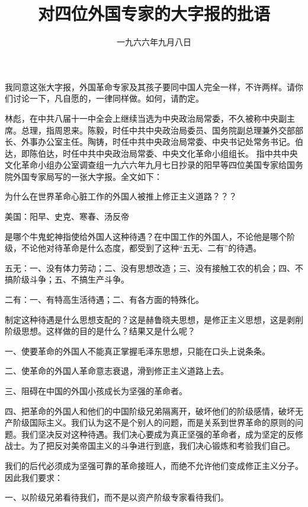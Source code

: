 
\title{对四位外国专家的大字报的批语}
\date{一九六六年九月八日}
\maketitle



我同意这张大字报，外国革命专家及其孩子要同中国人完全一样，不许两样。请你们讨论一下，凡自愿的，一律同样做。如何，请酌定。

\begin{maonote}
林彪，在中共八届十一中全会上继续当选为中央政治局常委，不久被称中央副主席。总理，指周恩来。陈毅，时任中共中央政治局委员、国务院副总理兼外交部部长、外事办公室主任。陶铸，时任中共中央政治局常委、中央书记处常务书记。伯达，即陈伯达，时任中共中央政治局常委、中央文化革命小组组长。
指中共中央文化革命小组办公室调查组一九六六年九月七日抄录的阳早等四位美国专家给国务院外国专家局写的一张大字报。全文如下：

为什么在世界革命心脏工作的外国人被推上修正主义道路？？？

美国：阳早、史克、寒春、汤反帝

是哪个牛鬼蛇神指使给外国人这种待遇？在中国工作的外国人，不论他是哪个阶级，不论他对待革命是什么态度，都受到了这种“五无、二有”的待遇。

五无：一、没有体力劳动；二、没有思想改造；三、没有接触工农的机会；四、不搞阶级斗争；五、不搞生产斗争。

二有：一、有特高生活待遇；二、有各方面的特殊化。

制定这种待遇是什么思想支配的？这是赫鲁晓夫思想，是修正主义思想，这是剥削阶级思想。这样做的目的是什么？结果又是什么呢？

一、使要革命的外国人不能真正掌握毛泽东思想，只能在口头上说条条。

二、使革命的外国人革命意志衰退，滑到修正主义道路上去。

三、阻碍在中国的外国小孩成长为坚强的革命者。

四、把革命的外国人和他们的中国阶级兄弟隔离开，破坏他们的阶级感情，破坏无产阶级国际主义。我们认为这不是个别人的问题，而是关系到世界革命的原则的问题。我们坚决反对这种待遇。我们决心要成为真正坚强的革命者，成为坚定的反修战士。为了把反对美帝国主义的斗争进行到底，我们决心锻炼和考验我们自己。

我们的后代必须成为坚强可靠的革命接班人，而绝不允许他们变成修正主义分子。因此我们要求：

一、以阶级兄弟看待我们，而不是以资产阶级专家看待我们。


\end{maonote}
